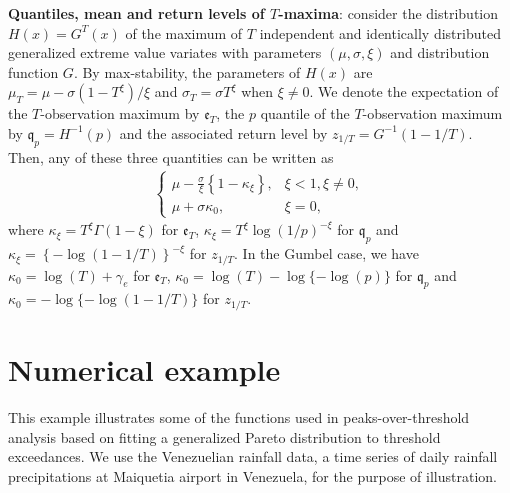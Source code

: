 \documentclass[]{book}
\begin{document}
\textbf{Quantiles, mean and return levels of \(T\)-maxima}: consider the distribution \(H(x) = G^T(x)\) of the maximum of \(T\) independent and identically distributed generalized extreme value variates with parameters \((\mu, \sigma, \xi)\) and distribution function \(G\). By max-stability, the parameters of \(H(x)\) are \(\mu_T=\mu-\sigma(1-T^\xi)/\xi\) and \(\sigma_T=\sigma T^\xi\) when \(\xi \neq 0\). We denote the expectation of the \(T\)-observation maximum by \(\mathfrak{e}_T\), the \(p\) quantile of the \(T\)-observation maximum by \(\mathfrak{q}_p = H^{-1}(p)\) and the associated return level by \(z_{1/T} = G^{-1}(1-1/T)\). Then, any of these three quantities can be written as
\begin{align*}
 \begin{cases}
 \mu-\frac{\sigma}{\xi}\left\{1-\kappa_{\xi}\right\}, &  \xi <1, \xi \neq 0, \\
 \mu+\sigma\kappa_0, &  \xi =0,
  \end{cases}
\end{align*}
where \(\kappa_{\xi}=T^\xi\Gamma(1-\xi)\) for \(\mathfrak{e}_T\), \(\kappa_{\xi}=T^\xi\log(1/p)^{-\xi}\) for \(\mathfrak{q}_p\) and \(\kappa_{\xi}=\left\{-\log\left(1-{1}/{T}\right)\right\}^{-\xi}\) for \(z_{1/T}\). In the Gumbel case, we have \(\kappa_0=\log(T)+\gamma_{e}\) for \(\mathfrak{e}_T\), \(\kappa_0=\log(T)-\log\{-\log(p)\}\) for \(\mathfrak{q}_p\) and \(\kappa_0=-\log\{-\log(1-1/T)\}\) for \(z_{1/T}\).

\hypertarget{numerical-example}{%
\section{Numerical example}\label{numerical-example}}

This example illustrates some of the functions used in peaks-over-threshold analysis based on fitting a generalized Pareto distribution to threshold exceedances. We use the Venezuelian rainfall data, a time series of daily rainfall precipitations at Maiquetia airport in Venezuela, for the purpose of illustration.
\end{document}
